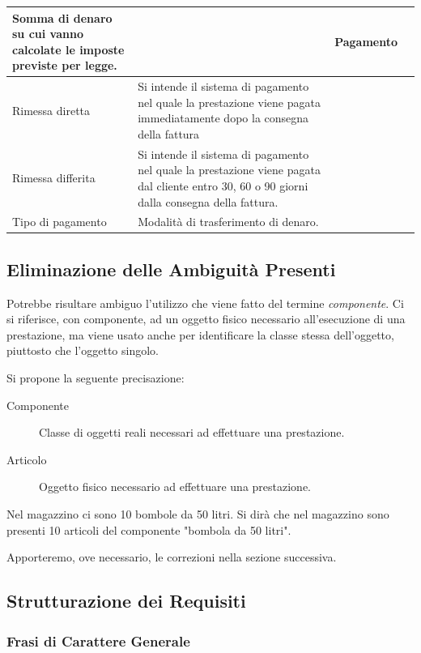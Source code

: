 \begin{longtable}{| p{2.5cm} | p{4.5cm} | p{2cm} | p{2.5cm} |}
			Somma di denaro su cui vanno calcolate le imposte previste per legge. &&
			Pagamento 
			\\ \hline
			Rimessa diretta &
			Si intende il sistema di pagamento nel quale la prestazione viene pagata immediatamente dopo la consegna della fattura &
			& \\ \hline
			Rimessa differita &
			Si intende il sistema di pagamento nel quale la prestazione viene pagata dal cliente entro 30, 60 o 90 giorni dalla consegna della fattura. &
			& \\ \hline
			Tipo di pagamento &
			Modalità di trasferimento di denaro. &
			& \\ \hline
				
		\end{longtable}
		
	\subsection{Eliminazione delle Ambiguità Presenti}
		
		Potrebbe risultare ambiguo l'utilizzo che viene fatto del termine \emph{componente}. Ci si riferisce, con componente, ad un oggetto fisico necessario all'esecuzione di una prestazione, ma viene usato anche per identificare la classe stessa dell'oggetto, piuttosto che l'oggetto singolo.
		
		Si propone la seguente precisazione:
		\begin{description}
			\item[Componente]
				Classe di oggetti reali necessari ad effettuare una prestazione.
			\item[Articolo]
				Oggetto fisico necessario ad effettuare una prestazione.
		\end{description}
		
		\begin{example}
			Nel magazzino ci sono 10 bombole da 50 litri. Si dirà che nel magazzino sono presenti 10 articoli del componente "bombola da 50 litri".
		\end{example}
		
		Apporteremo, ove necessario, le correzioni nella sezione successiva.
		
	\subsection{Strutturazione dei Requisiti}
	
		\subsubsection{Frasi di Carattere Generale}
					
